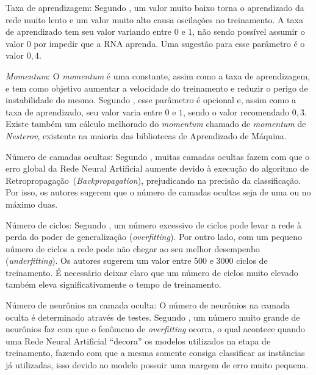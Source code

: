 \documentclass[12pt,oneside,a4paper,chapter=TITLE,section=TITLE,sumario
		=tradicional]{abntex2}
\begin{document}
		\begin{lista}
			\item Taxa de aprendizagem: Segundo , um valor muito baixo torna o aprendizado da rede muito lento e um valor muito alto causa oscilações no treinamento. A taxa de aprendizado tem seu valor variando entre $0$ e $1$, não sendo possível assumir o valor $0$ por impedir que a RNA aprenda. Uma sugestão para esse parâmetro é o valor $0,4$.
			
			\item \textit{Momentum}: O \textit{momentum} é uma constante, assim como a taxa de aprendizagem, e tem como objetivo aumentar a velocidade do treinamento e reduzir o perigo de instabilidade do mesmo. Segundo , esse parâmetro é opcional e, assim como a taxa de aprendizado, seu valor varia entre $0$ e $1$, sendo o valor recomendado $0,3$. Existe também um cálculo melhorado do \textit{momentum} chamado de \textit{momentum} de \textit{Nesterov}, existente na maioria das bibliotecas de Aprendizado de Máquina.
				
			\item Número de camadas ocultas: Segundo , muitas camadas ocultas fazem com que o erro global da Rede Neural Artificial aumente devido à execução do algoritmo de Retropropagação~(\textit{Backpropagation}), prejudicando na precisão da classificação. Por isso, os autores sugerem que o número de camadas ocultas seja de uma ou no máximo duas.
				
			\item Número de ciclos: Segundo , um número excessivo de ciclos pode levar a rede à perda do poder de generalização (\textit{overfitting}). Por outro lado, com um pequeno número de ciclos a rede pode não chegar ao seu melhor desempenho (\textit{underfitting}). Os autores sugerem um valor entre 500 e 3000 ciclos de treinamento. É necessário deixar claro que um número de ciclos muito elevado também eleva significativamente o tempo de treinamento.
				
			\item Número de neurônios na camada oculta: O número de neurônios na camada oculta é determinado através de testes. Segundo , um número muito grande de neurônios faz com que o fenômeno de \textit{overfitting} ocorra, o qual acontece quando uma Rede Neural Artificial ``decora'' os modelos utilizados na etapa de treinamento, fazendo com que a mesma somente consiga classificar as instâncias já utilizadas, isso devido ao modelo possuir uma margem de erro muito pequena. 
			

\end{lista}
\end{document}
